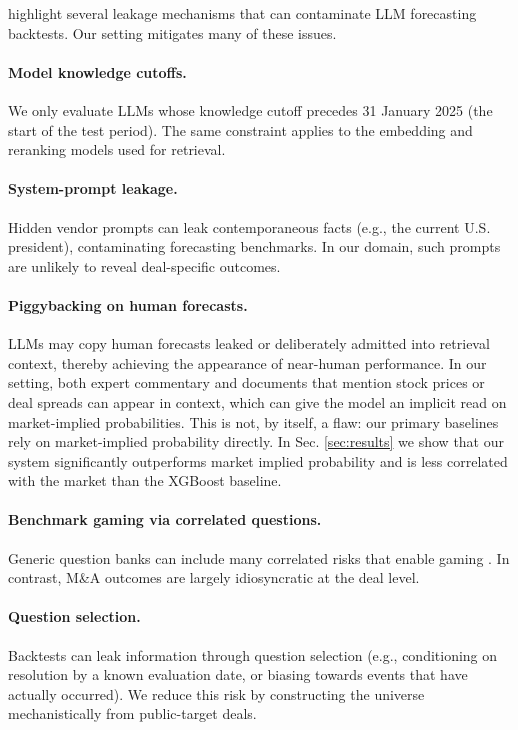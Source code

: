 \documentclass{article}
\theoremstyle{plain}
\theoremstyle{definition}
\theoremstyle{remark}
\begin{document}
\citet{paleka2025pitfalls} highlight several leakage mechanisms that can contaminate LLM forecasting backtests. Our setting mitigates many of these issues.

\paragraph{Model knowledge cutoffs.} We only evaluate LLMs whose knowledge cutoff precedes 31 January 2025 (the start of the test period). The same constraint applies to the embedding and reranking models used for retrieval.
    
\paragraph{System-prompt leakage.} Hidden vendor prompts can leak contemporaneous facts (e.g., the current U.S. president), contaminating forecasting benchmarks. In our domain, such prompts are unlikely to reveal deal-specific outcomes.
    
\paragraph{Piggybacking on human forecasts.} LLMs may copy human forecasts leaked or deliberately admitted into retrieval context, thereby achieving the appearance of near-human performance. In our setting, both expert commentary and documents that mention stock prices or deal spreads can appear in context, which can give the model an implicit read on market-implied probabilities. This is not, by itself, a flaw: our primary baselines rely on market-implied probability directly. In Sec. \ref{sec:results} we show that our system significantly outperforms market implied probability and is less correlated with the market than the XGBoost baseline.
    
\paragraph{Benchmark gaming via correlated questions.} Generic question banks can include many correlated risks that enable gaming \cite{sempere2021alignment}. In contrast, M\&A outcomes are largely idiosyncratic at the deal level.
    
\paragraph{Question selection.} Backtests can leak information through question selection (e.g., conditioning on resolution by a known evaluation date, or biasing towards events that have actually occurred). We reduce this risk by constructing the universe mechanistically from public-target deals.
    
\end{document}
